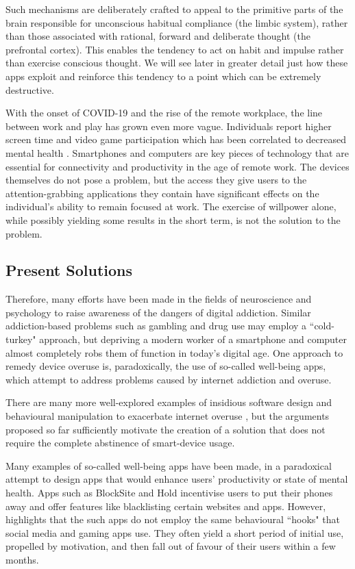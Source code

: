 Such mechanisms are deliberately crafted to appeal to the primitive parts of the brain responsible for unconscious habitual compliance (the limbic system), rather than those associated with rational, forward and deliberate thought (the prefrontal cortex). This enables the tendency to act on habit and impulse rather than exercise conscious thought. We will see later in greater detail just how these apps exploit and reinforce this tendency to a point which can be extremely destructive.

With the onset of COVID-19 and the rise of the remote workplace, the line between work and play has grown even more vague. Individuals report higher screen time and video game participation which has been correlated to decreased mental health \cite{colley2020exercise}. Smartphones and computers are key pieces of technology that are essential for connectivity and productivity in the age of remote work. The devices themselves do not pose a problem, but the access they give users to the attention-grabbing applications they contain have significant effects on the individual's ability to remain focused at work. The exercise of willpower alone, while possibly yielding some results in the short term, is not the solution to the problem.

\subsection{Present Solutions}
Therefore, many efforts have been made in the fields of neuroscience and psychology to raise awareness of the dangers of digital addiction. Similar addiction-based problems such as gambling and drug use may employ a ``cold-turkey" approach, but depriving a modern worker of a smartphone and computer almost completely robs them of function in today's digital age. One approach to remedy device overuse is, paradoxically, the use of so-called well-being apps, which attempt to address problems caused by internet addiction and overuse.

There are many more well-explored examples of insidious software design and behavioural manipulation to exacerbate internet overuse \cite{sagePaper2020}, but the arguments proposed so far sufficiently motivate the creation of a solution that does not require the complete abstinence of smart-device usage.

Many examples of so-called well-being apps have been made, in a paradoxical attempt to design apps that would enhance users' productivity or state of mental health. Apps such as BlockSite and Hold incentivise users to put their phones away and offer features like blacklisting certain websites and apps. However, \cite{sagePaper2020} highlights that the such apps do not employ the same behavioural ``hooks" that social media and gaming apps use. They often yield a short period of initial use, propelled by motivation, and then fall out of favour of their users within a few months.

